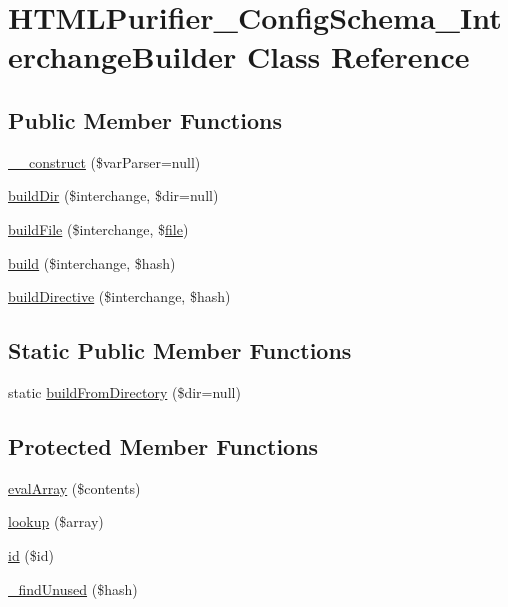 \hypertarget{classHTMLPurifier__ConfigSchema__InterchangeBuilder}{\section{H\+T\+M\+L\+Purifier\+\_\+\+Config\+Schema\+\_\+\+Interchange\+Builder Class Reference}
\label{classHTMLPurifier__ConfigSchema__InterchangeBuilder}
}
\subsection*{Public Member Functions}
\begin{DoxyCompactItemize}
\item 
\hyperlink{classHTMLPurifier__ConfigSchema__InterchangeBuilder_abbb50fe172deefa48e6ee45c7788edc5}{\+\_\+\+\_\+construct} (\$var\+Parser=null)
\item 
\hyperlink{classHTMLPurifier__ConfigSchema__InterchangeBuilder_a9433439ac47f63daf87ec5a222e594e7}{build\+Dir} (\$interchange, \$dir=null)
\item 
\hyperlink{classHTMLPurifier__ConfigSchema__InterchangeBuilder_a27a2defa6b80e63ec0d8659977df5930}{build\+File} (\$interchange, \$\hyperlink{classfile}{file})
\item 
\hyperlink{classHTMLPurifier__ConfigSchema__InterchangeBuilder_a49e5ee0ddfa589c46582ebeac56d6b14}{build} (\$interchange, \$hash)
\item 
\hyperlink{classHTMLPurifier__ConfigSchema__InterchangeBuilder_a8595024430063d857d0e3eba629dd16d}{build\+Directive} (\$interchange, \$hash)
\end{DoxyCompactItemize}
\subsection*{Static Public Member Functions}
\begin{DoxyCompactItemize}
\item 
static \hyperlink{classHTMLPurifier__ConfigSchema__InterchangeBuilder_ab5df851a0afacc6dd24a13c66a3daf8a}{build\+From\+Directory} (\$dir=null)
\end{DoxyCompactItemize}
\subsection*{Protected Member Functions}
\begin{DoxyCompactItemize}
\item 
\hyperlink{classHTMLPurifier__ConfigSchema__InterchangeBuilder_a63eb6cfcdd39c02c11c4f4a832d6af1c}{eval\+Array} (\$contents)
\item 
\hyperlink{classHTMLPurifier__ConfigSchema__InterchangeBuilder_a8ecf76e83da57edad0016d3efc98c3ec}{lookup} (\$array)
\item 
\hyperlink{classHTMLPurifier__ConfigSchema__InterchangeBuilder_a79117cedde5c65f403b97996dbb2adbe}{id} (\$id)
\item 
\hyperlink{classHTMLPurifier__ConfigSchema__InterchangeBuilder_a97396e90cf11a8a3c81b1c44428600ed}{\+\_\+find\+Unused} (\$hash)
\end{DoxyCompactItemize}
